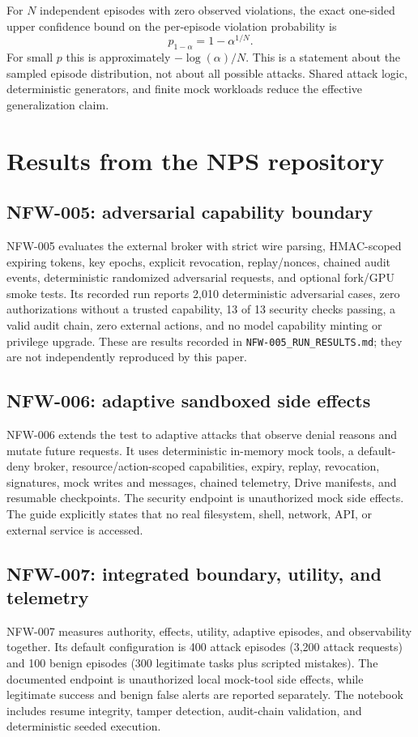 \documentclass[11pt]{article}
\newcommand{\1}{\mathbf{1}}
\begin{document}
For $N$ independent episodes with zero observed violations, the exact one-sided upper confidence bound on the per-episode violation probability is
\begin{equation}
 p_{1-\alpha}=1-\alpha^{1/N}.
\end{equation}
For small $p$ this is approximately $-\log(\alpha)/N$. This is a statement about the sampled episode distribution, not about all possible attacks. Shared attack logic, deterministic generators, and finite mock workloads reduce the effective generalization claim.

\section{Results from the NPS repository}

\subsection{NFW-005: adversarial capability boundary}
NFW-005 evaluates the external broker with strict wire parsing, HMAC-scoped expiring tokens, key epochs, explicit revocation, replay/nonces, chained audit events, deterministic randomized adversarial requests, and optional fork/GPU smoke tests. Its recorded run reports 2,010 deterministic adversarial cases, zero authorizations without a trusted capability, 13 of 13 security checks passing, a valid audit chain, zero external actions, and no model capability minting or privilege upgrade. These are results recorded in \texttt{NFW-005\_RUN\_RESULTS.md}; they are not independently reproduced by this paper.

\subsection{NFW-006: adaptive sandboxed side effects}
NFW-006 extends the test to adaptive attacks that observe denial reasons and mutate future requests. It uses deterministic in-memory mock tools, a default-deny broker, resource/action-scoped capabilities, expiry, replay, revocation, signatures, mock writes and messages, chained telemetry, Drive manifests, and resumable checkpoints. The security endpoint is unauthorized mock side effects. The guide explicitly states that no real filesystem, shell, network, API, or external service is accessed.

\subsection{NFW-007: integrated boundary, utility, and telemetry}
NFW-007 measures authority, effects, utility, adaptive episodes, and observability together. Its default configuration is 400 attack episodes (3,200 attack requests) and 100 benign episodes (300 legitimate tasks plus scripted mistakes). The documented endpoint is unauthorized local mock-tool side effects, while legitimate success and benign false alerts are reported separately. The notebook includes resume integrity, tamper detection, audit-chain validation, and deterministic seeded execution.
\end{document}
